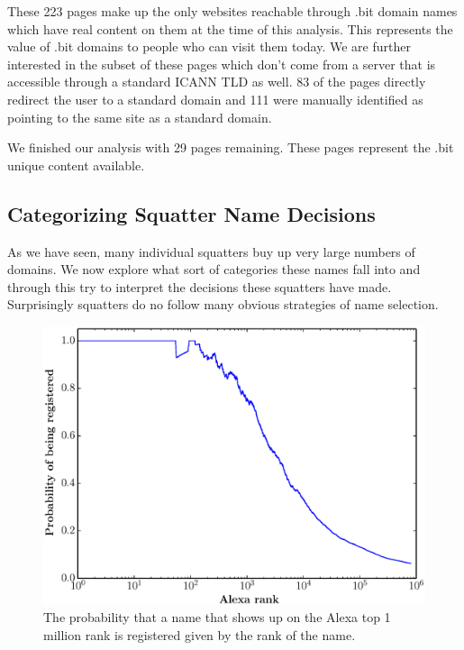 These 223 pages make up the only websites reachable through .bit domain names which have real content on them at the time of this analysis. This represents the value of .bit domains to people who can visit them today. We are further interested in the subset of these pages which don't come from a server that is accessible through a standard ICANN TLD as well.  83 of the pages directly redirect the user to a standard domain and 111 were manually identified as pointing to the same site as a standard domain.

We finished our analysis with 29 pages remaining. These pages represent the .bit unique content available.

\subsection{Categorizing Squatter Name Decisions}

As we have seen, many individual squatters buy up very large numbers of domains. We now explore what sort of categories these names fall into and through this try to interpret the decisions these squatters have made. Surprisingly squatters do no follow many obvious strategies of name selection.

\begin{figure}
  \centering
  \includegraphics[width=\columnwidth]{figures/alexa_probability}
  \caption{The probability that a name that shows up on the Alexa top 1 million rank is registered given by the rank of the name.}
  \label{fig:alexa_probability}
\end{figure}

